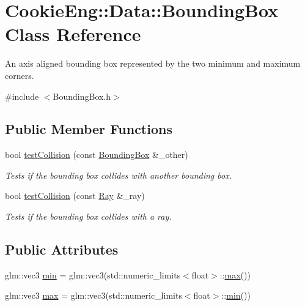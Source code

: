 \hypertarget{class_cookie_eng_1_1_data_1_1_bounding_box}{}\section{Cookie\+Eng\+:\+:Data\+:\+:Bounding\+Box Class Reference}
\label{class_cookie_eng_1_1_data_1_1_bounding_box}


An axis aligned bounding box represented by the two minimum and maximum corners.  




{\ttfamily \#include $<$Bounding\+Box.\+h$>$}

\subsection*{Public Member Functions}
\begin{DoxyCompactItemize}
\item 
bool \hyperlink{class_cookie_eng_1_1_data_1_1_bounding_box_a94539a8dd3721908761cd412b1118a89}{test\+Collision} (const \hyperlink{class_cookie_eng_1_1_data_1_1_bounding_box}{Bounding\+Box} \&\+\_\+other)
\begin{DoxyCompactList}\small\item\em Tests if the bounding box collides with another bounding box. \end{DoxyCompactList}\item 
bool \hyperlink{class_cookie_eng_1_1_data_1_1_bounding_box_aca6e208bb82b3842ac475bbc25c0ff0a}{test\+Collision} (const \hyperlink{struct_cookie_eng_1_1_data_1_1_ray}{Ray} \&\+\_\+ray)
\begin{DoxyCompactList}\small\item\em Tests if the bounding box collides with a ray. \end{DoxyCompactList}\end{DoxyCompactItemize}
\subsection*{Public Attributes}
\begin{DoxyCompactItemize}
\item 
glm\+::vec3 \hyperlink{class_cookie_eng_1_1_data_1_1_bounding_box_ad7e51530c82882e0606c0b63d27fd6e5}{min} = glm\+::vec3(std\+::numeric\+\_\+limits$<$float$>$\+::\hyperlink{class_cookie_eng_1_1_data_1_1_bounding_box_a67a8ab24fefc25d92bd154273ee72e95}{max}())
\item 
glm\+::vec3 \hyperlink{class_cookie_eng_1_1_data_1_1_bounding_box_a67a8ab24fefc25d92bd154273ee72e95}{max} = glm\+::vec3(std\+::numeric\+\_\+limits$<$float$>$\+::\hyperlink{class_cookie_eng_1_1_data_1_1_bounding_box_ad7e51530c82882e0606c0b63d27fd6e5}{min}())
\end{DoxyCompactItemize}


